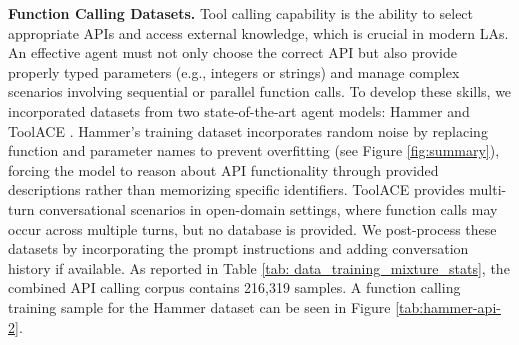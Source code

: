 \noindent\textbf{Function Calling Datasets.} Tool calling capability is the ability to select appropriate APIs and access external knowledge, which is crucial in modern LAs. An effective agent must not only choose the correct API but also provide properly typed parameters (e.g., integers or strings) and manage complex scenarios involving sequential or parallel function calls. To develop these skills, we incorporated datasets from two state-of-the-art agent models: Hammer \cite{Lin2024Hammer} and ToolACE \cite{Liu2024ToolACE}. Hammer's training dataset incorporates random noise by replacing function and parameter names to prevent overfitting (see Figure \ref{fig:summary}), forcing the model to reason about API functionality through provided descriptions rather than memorizing specific identifiers. ToolACE provides multi-turn conversational scenarios in open-domain settings, where function calls may occur across multiple turns, but no database is provided. We post-process these datasets by incorporating the prompt instructions and adding conversation history if available. As reported in Table \ref{tab: data_training_mixture_stats}, the combined API calling corpus contains 216,319 samples. A function calling training sample for the Hammer dataset can be seen in Figure \ref{tab:hammer-api-2}.  %

\vspace{3mm}

